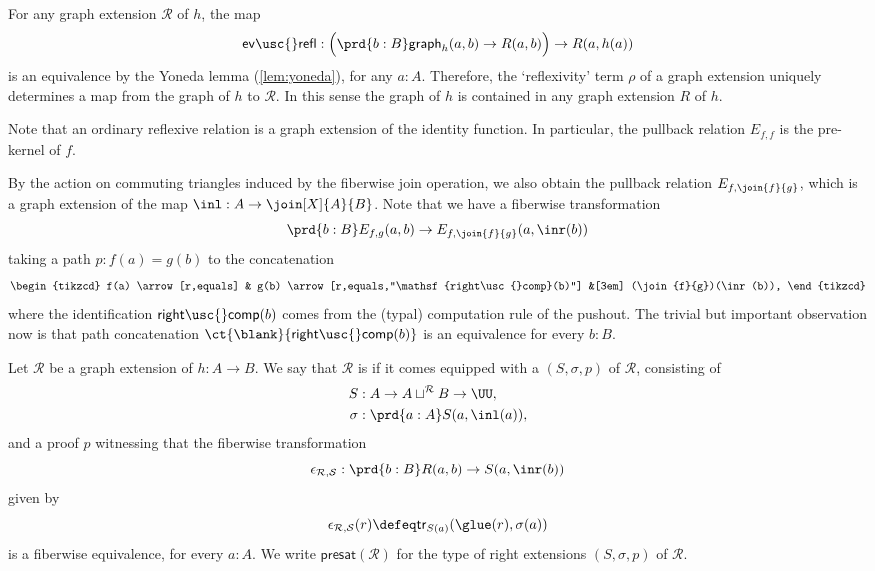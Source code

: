 \begin{rmk}
For any graph extension $\mathcal{R}$ of $h$, the map
\begin{equation*}
\mathsf{ev\usc{}refl}:\Big(\prd{b:B} \mathsf{graph}_h(a,b)\to R(a,b)\Big)\to R(a,h(a))
\end{equation*}
is an equivalence by the Yoneda lemma (\cref{lem:yoneda}), for any $a:A$. Therefore, the `reflexivity' term $\rho$ of a graph extension uniquely determines a map from the graph of $h$ to $\mathcal{R}$. In this sense the graph of $h$ is contained in any graph extension $R$ of $h$. 

Note that an ordinary reflexive relation is a graph extension of the identity function. In particular, the pullback relation $E_{f,f}$ is the pre-kernel of $f$. 
\end{rmk}

By the action on commuting triangles induced by the fiberwise join operation, we also obtain the pullback relation $E_{f,\join{f}{g}}$, which is a graph extension of the map $\inl:A\to \join[X]{A}{B}$. Note that we have a fiberwise transformation
\begin{equation*}
\prd{b:B}E_{f,g}(a,b)\to E_{f,\join{f}{g}}(a,\inr(b))
\end{equation*}
taking a path $p:f(a)=g(b)$ to the concatenation
\begin{equation*}
\begin{tikzcd}
f(a) \arrow[r,equals] & g(b) \arrow[r,equals,"\mathsf{right\usc{}comp}(b)"] &[3em] (\join{f}{g})(\inr(b)),
\end{tikzcd}
\end{equation*}
where the identification $\mathsf{right\usc{}comp}(b)$ comes from the (typal) computation rule of the pushout.
The trivial but important observation now is that path concatenation $\ct{\blank}{\mathsf{right\usc{}comp}(b)}$ is an equivalence for every $b:B$.

\begin{defn}
Let $\mathcal{R}$ be a graph extension of $h:A\to B$. We say that $\mathcal{R}$ is  if it comes equipped with a  $(S,\sigma,p)$ of $\mathcal{R}$, consisting of
\begin{align*}
S & : A \to A\sqcup^{\mathcal{R}}B\to\UU, \\
\sigma & : \prd{a:A} S(a,\inl(a)),
\end{align*}
and a proof $p$ witnessing that the fiberwise transformation
\begin{equation*}
\epsilon_{\mathcal{R},\mathcal{S}}:\prd{b:B} R(a,b)\to S(a,\inr(b))
\end{equation*}
given by 
\begin{equation*}
\epsilon_{\mathcal{R},\mathcal{S}}(r)\defeq \mathsf{tr}_{S(a)}(\glue(r),\sigma(a))
\end{equation*}
is a fiberwise equivalence, for every $a:A$. We write $\mathsf{presat}(\mathcal{R})$ for the type of right extensions $(S,\sigma,p)$ of $\mathcal{R}$.
\end{defn}

